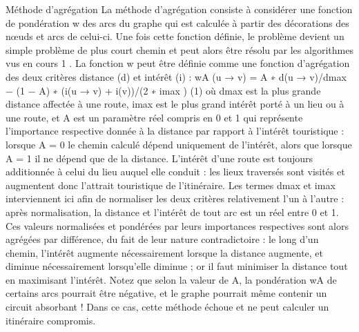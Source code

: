 Méthode d’agrégation
La méthode d’agrégation consiste à considérer une fonction de pondération w des arcs du graphe
qui est calculée à partir des décorations des nœuds et arcs de celui-ci. Une fois cette fonction définie, le
problème devient un simple problème de plus court chemin et peut alors être résolu par les algorithmes
vus en cours 1 . La fonction w peut être définie comme une fonction d’agrégation des deux critères distance
(d) et intérêt (i) :
wA (u → v) = A ∗ d(u → v)/dmax − (1 − A) ∗ (i(u → v) + i(v))/(2 ∗ imax )
(1)
où dmax est la plus grande distance affectée à une route, imax est le plus grand intérêt porté à un lieu ou
à une route, et A est un paramètre réel compris en 0 et 1 qui représente l’importance respective donnée
à la distance par rapport à l’intérêt touristique : lorsque A = 0 le chemin calculé dépend uniquement
de l’intérêt, alors que lorsque A = 1 il ne dépend que de la distance. L’intérêt d’une route est toujours
additionnée à celui du lieu auquel elle conduit : les lieux traversés sont visités et augmentent donc l’attrait
touristique de l’itinéraire. Les termes dmax et imax interviennent ici afin de normaliser les deux critères
relativement l’un à l’autre : après normalisation, la distance et l’intérêt de tout arc est un réel entre 0 et 1.
Ces valeurs normalisées et pondérées par leurs importances respectives sont alors agrégées par différence,
du fait de leur nature contradictoire : le long d’un chemin, l’intérêt augmente nécessairement lorsque la
distance augmente, et diminue nécessairement lorsqu’elle diminue ; or il faut minimiser la distance tout
en maximisant l’intérêt. Notez que selon la valeur de A, la pondération wA de certains arcs pourrait être
négative, et le graphe pourrait même contenir un circuit absorbant ! Dans ce cas, cette méthode échoue
et ne peut calculer un itinéraire compromis.


\clearpage
